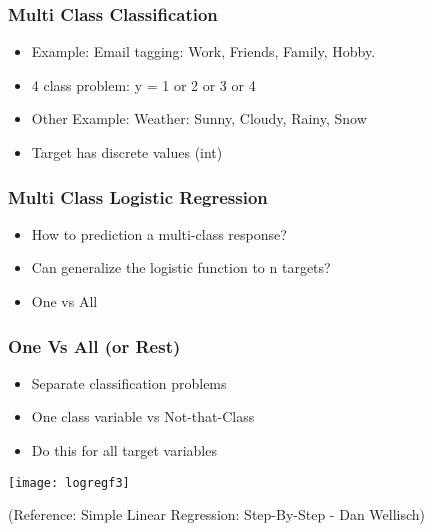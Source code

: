 
\begin{frame}[fragile]\frametitle{Multi Class Classification}
\begin{itemize}
\item Example: Email tagging: Work, Friends, Family, Hobby.
\item 4 class problem: y = 1 or 2 or 3 or 4
\item Other Example: Weather: Sunny, Cloudy, Rainy, Snow
\item Target has discrete values (int)
\end{itemize}
\end{frame}

\begin{frame}[fragile]\frametitle{Multi Class Logistic Regression}
\begin{itemize}
\item How to prediction a multi-class response?
\item Can generalize the logistic function to n targets?
\item One vs All
\end{itemize}
\end{frame}

\begin{frame}[fragile]\frametitle{One Vs All (or Rest)}
\begin{itemize}
\item Separate classification problems
\item One class variable vs Not-that-Class
\item Do this for all target variables
\end{itemize}
\begin{center}
\texttt{[image: logregf3]}
\end{center}
\tiny{(Reference: Simple Linear Regression: Step-By-Step - Dan Wellisch)}
\end{frame}

